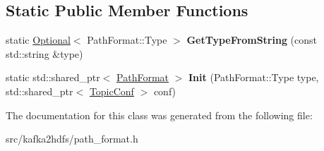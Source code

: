 \subsection*{Static Public Member Functions}
\begin{DoxyCompactItemize}
\item 
static \hyperlink{classlog2hdfs_1_1Optional}{Optional}$<$ Path\+Format\+::\+Type $>$ {\bfseries Get\+Type\+From\+String} (const std\+::string \&type)\hypertarget{classlog2hdfs_1_1PathFormat_ab8b176f25e66a79ce009db193114ca49}{}\label{classlog2hdfs_1_1PathFormat_ab8b176f25e66a79ce009db193114ca49}

\item 
static std\+::shared\+\_\+ptr$<$ \hyperlink{classlog2hdfs_1_1PathFormat}{Path\+Format} $>$ {\bfseries Init} (Path\+Format\+::\+Type type, std\+::shared\+\_\+ptr$<$ \hyperlink{classlog2hdfs_1_1TopicConf}{Topic\+Conf} $>$ conf)\hypertarget{classlog2hdfs_1_1PathFormat_a1ceb4949518daba1605d77b1730d0da8}{}\label{classlog2hdfs_1_1PathFormat_a1ceb4949518daba1605d77b1730d0da8}

\end{DoxyCompactItemize}


The documentation for this class was generated from the following file\+:\begin{DoxyCompactItemize}
\item 
src/kafka2hdfs/path\+\_\+format.\+h\end{DoxyCompactItemize}
